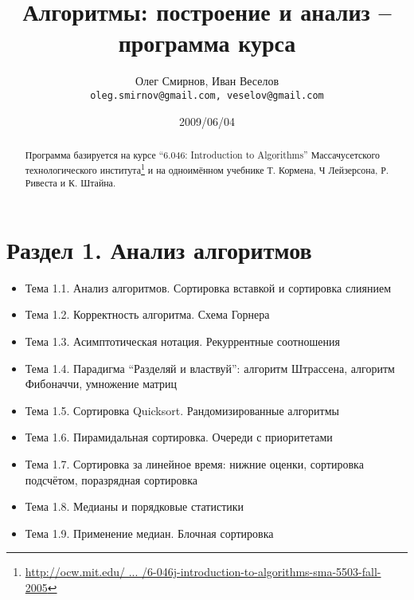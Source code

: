 \documentclass[a4paper,11pt]{article}
\author{Олег Смирнов, Иван Веселов \\
\texttt{oleg.smirnov@gmail.com, veselov@gmail.com}}
\date{2009/06/04}
\title{Алгоритмы: построение и анализ -- программа курса}
\begin{document}
\maketitle
\begin{abstract}
Программа базируется на курсе ``6.046: Introduction to Algorithms'' Массачусетского
технологического института\footnote{\href{http://goo.gl/jIOiq}
{http://ocw.mit.edu/ ... /6-046j-introduction-to-algorithms-sma-5503-fall-2005}} и
на одноимённом учебнике Т. Кормена, Ч Лейзерсона, Р. Ривеста и К. Штайна.
\end{abstract}
\section*{Раздел 1. Анализ алгоритмов}
\begin{itemize}
\item Тема 1.1. Анализ алгоритмов. Сортировка вставкой и сортировка слиянием
\item Тема 1.2. Корректность алгоритма. Схема Горнера
\item Тема 1.3. Асимптотическая нотация. Рекуррентные соотношения
\item Тема 1.4. Парадигма ``Разделяй и властвуй'': алгоритм Штрассена, алгоритм Фибоначчи, умножение матриц
\item Тема 1.5. Сортировка Quicksort. Рандомизированные алгоритмы
\item Тема 1.6. Пирамидальная сортировка. Очереди с приоритетами
\item Тема 1.7. Сортировка за линейное время: нижние оценки, сортировка подсчётом, поразрядная сортировка
\item Тема 1.8. Медианы и порядковые статистики
\item Тема 1.9. Применение медиан. Блочная сортировка
\end{itemize}
\end{document}
